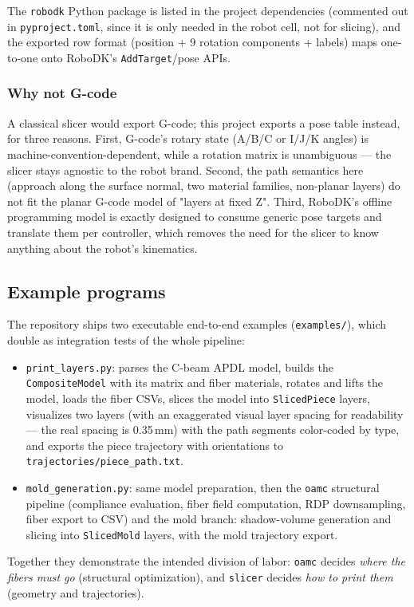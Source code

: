 The \texttt{robodk} Python package is listed in the project
dependencies (commented out in \texttt{pyproject.toml}, since it is
only needed in the robot cell, not for slicing), and the exported
row format (position + 9 rotation components + labels) maps one-to-one
onto RoboDK's \texttt{AddTarget}/pose APIs.

\subsubsection{Why not G-code}

A classical slicer would export G-code; this project exports a pose
table instead, for three reasons. First, G-code's rotary state (A/B/C
or I/J/K angles) is machine-convention-dependent, while a rotation
matrix is unambiguous --- the slicer stays agnostic to the robot brand.
Second, the path semantics here (approach along the surface normal,
two material families, non-planar layers) do not fit the planar
G-code model of "layers at fixed Z". Third, RoboDK's offline
programming model is exactly designed to consume generic pose
targets and translate them per controller, which removes the need for
the slicer to know anything about the robot's kinematics.

\subsection{Example programs}\label{sec:impl-examples}

The repository ships two executable end-to-end examples
(\texttt{examples/}), which double as integration tests of the whole
pipeline:

\begin{itemize}
  \item \texttt{print\_layers.py}: parses the C-beam APDL model, builds
        the \texttt{CompositeModel} with its matrix and fiber
        materials, rotates and lifts the model, loads the fiber CSVs,
        slices the model into \texttt{SlicedPiece} layers, visualizes
        two layers (with an exaggerated visual layer spacing for
        readability --- the real spacing is 0.35\,mm) with the path
        segments color-coded by type, and exports the piece trajectory
        with orientations to
        \texttt{trajectories/piece\_path.txt}.
  \item \texttt{mold\_generation.py}: same model preparation, then the
        \texttt{oamc} structural pipeline (compliance evaluation,
        fiber field computation, RDP downsampling, fiber export to
        CSV) and the mold branch: shadow-volume generation and
        slicing into \texttt{SlicedMold} layers, with the mold
        trajectory export.
\end{itemize}

Together they demonstrate the intended division of labor:
\texttt{oamc} decides \emph{where the fibers must go} (structural
optimization), and \texttt{slicer} decides \emph{how to print them}
(geometry and trajectories).
